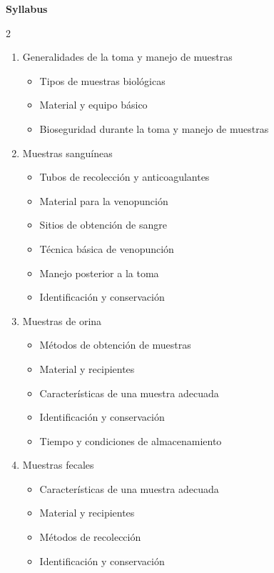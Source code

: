 \begin{center}
	\vspace{-.32cm}
	\textbf{Syllabus}
	\vspace{-.32cm}
\end{center}

\begin{multicols}{2}
	
	\begin{enumerate}
		\setlength\itemsep{-10pt}
		\item Generalidades de la toma y manejo de muestras
		\begin{itemize}
			\vspace{-10pt}
			\setlength\itemsep{-4pt}
			\item Tipos de muestras biológicas
			\item Material y equipo básico
			\item Bioseguridad durante la toma y manejo de muestras
		\end{itemize}
		\item Muestras sanguíneas
		\begin{itemize}
			\vspace{-10pt}
			\setlength\itemsep{-4pt}
			\item Tubos de recolección y anticoagulantes
			\item Material para la venopunción
			\item Sitios de obtención de sangre
			\item Técnica básica de venopunción
			\item Manejo posterior a la toma
			\item Identificación y conservación
		\end{itemize}
		\item Muestras de orina
		\begin{itemize}
			\vspace{-10pt}
			\setlength\itemsep{-4pt}
			\item Métodos de obtención de muestras
			\item Material y recipientes
			\item Características de una muestra adecuada
			\item Identificación y conservación
			\item Tiempo y condiciones de almacenamiento
		\end{itemize}
		\item Muestras fecales
		\begin{itemize}
			\vspace{-10pt}
			\setlength\itemsep{-4pt}
			\item Características de una muestra adecuada
			\item Material y recipientes
			\item Métodos de recolección
			\item Identificación y conservación
		\end{itemize}
	\end{enumerate}
	

\end{multicols}
